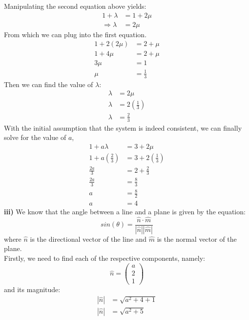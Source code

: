 \documentclass[hidelinks, a4paper, 12pt]{article}
\newcommand{\bd}{\textbf}
\newcommand{\thus}{\Rightarrow}
\newcommand{\nhat}{\hat{n}}
\newcommand{\mhat}{\hat{m}}
\begin{document}
            Manipulating the second equation above yields:
            \[\begin{split}
                1 + \lambda &= 1 + 2\mu\\
                \thus \lambda &= 2 \mu
            \end{split}\]
            From which we can plug into the first equation.
            \[\begin{split}
                1 + 2(2\mu) &= 2 + \mu\\
                1 + 4\mu &= 2 + \mu\\
                3\mu &= 1\\
                \mu &= \frac{1}{3}
            \end{split}\]
            Then we can find the value of $\lambda$:
            \[\begin{split}
                \lambda &= 2 \mu\\
                \lambda &= 2 \left(\frac{1}{3}\right)\\
                \lambda &= \frac{2}{3}
            \end{split}\]
            With the initial assumption that the system is indeed consistent, we can finally solve for the value of $a$,
            \[\begin{split}
                1 + a \lambda &= 3 + 2\mu\\
                1 + a \left(\frac{2}{3}\right) &= 3 + 2 \left(\frac{1}{3}\right)\\
                \frac{2a}{3} &= 2 + \frac{2}{3}\\
                \frac{2a}{3} &= \frac{8}{3}\\
                a &= \frac{8}{2}\\
                a &= 4
            \end{split}\]
            \bd{iii) }We know that the angle between a line and a plane is given by the equation:
            \[sin(\theta) = \frac{\nhat\cdot\mhat}{|\nhat||\mhat|}\]
            where $\nhat$ is the directional vector of the line and $\mhat$ is the normal vector of the plane.\\
            Firstly, we need to find each of the respective components, namely:
            \[\nhat = \begin{pmatrix} a \\ 2 \\ 1 \end{pmatrix}\]
            and its magnitude:
            \[\begin{split}
                |\nhat| &= \sqrt{a^2 + 4 + 1}\\
                |\nhat| &= \sqrt{a^2 + 5}
            \end{split}\]
\end{document}
